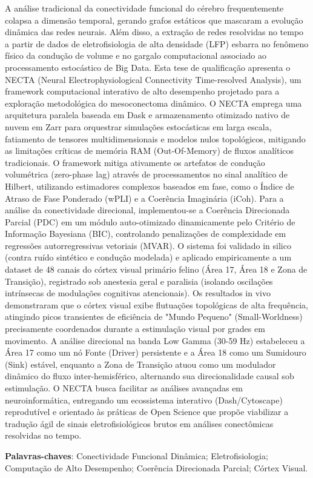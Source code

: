 \setlength{\absparsep}{18pt} %
\begin{resumo}[Resumo]

A análise tradicional da conectividade funcional do cérebro frequentemente colapsa a dimensão temporal, gerando grafos estáticos que mascaram a evolução dinâmica das redes neurais. Além disso, a extração de redes resolvidas no tempo a partir de dados de eletrofisiologia de alta densidade (LFP) esbarra no fenômeno físico da condução de volume e no gargalo computacional associado ao processamento estocástico de Big Data. Esta tese de qualificação apresenta o NECTA (Neural Electrophysiological Connectivity Time-resolved Analysis), um framework computacional interativo de alto desempenho projetado para a exploração metodológica do mesoconectoma dinâmico. O NECTA emprega uma arquitetura paralela baseada em Dask e armazenamento otimizado nativo de nuvem em Zarr para orquestrar simulações estocásticas em larga escala, fatiamento de tensores multidimensionais e modelos nulos topológicos, mitigando as limitações críticas de memória RAM (Out-Of-Memory) de fluxos analíticos tradicionais. O framework mitiga ativamente os artefatos de condução volumétrica (zero-phase lag) através de processamentos no sinal analítico de Hilbert, utilizando estimadores complexos baseados em fase, como o Índice de Atraso de Fase Ponderado (wPLI) e a Coerência Imaginária (iCoh). Para a análise da conectividade direcional, implementou-se a Coerência Direcionada Parcial (PDC) em um módulo auto-otimizado dinamicamente pelo Critério de Informação Bayesiana (BIC), controlando penalizações de complexidade em regressões autorregressivas vetoriais (MVAR). O sistema foi validado in silico (contra ruído sintético e condução modelada) e aplicado empiricamente a um dataset de 48 canais do córtex visual primário felino (Área 17, Área 18 e Zona de Transição), registrado sob anestesia geral e paralisia (isolando oscilações intrínsecas de modulações cognitivas atencionais). Os resultados in vivo demonstraram que o córtex visual exibe flutuações topológicas de alta frequência, atingindo picos transientes de eficiência de "Mundo Pequeno" (Small-Worldness) precisamente coordenados durante a estimulação visual por grades em movimento. A análise direcional na banda Low Gamma (30-59 Hz) estabeleceu a Área 17 como um nó Fonte (Driver) persistente e a Área 18 como um Sumidouro (Sink) estável, enquanto a Zona de Transição atuou como um modulador dinâmico do fluxo inter-hemisférico, alternando sua direcionalidade causal sob estimulação. O NECTA busca facilitar as análises avançadas em neuroinformática, entregando um ecossistema interativo (Dash/Cytoscape) reprodutível e orientado às práticas de Open Science que propõe viabilizar a tradução ágil de sinais eletrofisiológicos brutos em análises conectômicas resolvidas no tempo.

\vspace{\onelineskip}
 \noindent
 \textbf{Palavras-chaves}: Conectividade Funcional Dinâmica; Eletrofisiologia; Computação de Alto Desempenho; Coerência Direcionada Parcial; Córtex Visual.
\end{resumo}

